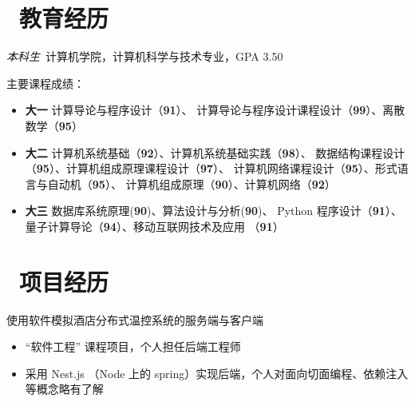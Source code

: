 \documentclass{resume}
\begin{document}



\section{\faGraduationCap\  教育经历}
\textit{本科生}\ 计算机学院，计算机科学与技术专业，GPA 3.50

\begin{onehalfspacing}
  主要课程成绩：
\end{onehalfspacing}
\begin{itemize}
  \item \textbf{大一} \quad 计算导论与程序设计（\textbf{91}）、
        计算导论与程序设计课程设计（\textbf{99}）、离散数学（\textbf{95}）
  \item \textbf{大二} \quad 计算机系统基础（\textbf{92}）、计算机系统基础实践（\textbf{98}）、
        数据结构课程设计（\textbf{95}）、计算机组成原理课程设计（\textbf{97}）、
        计算机网络课程设计（\textbf{95}）、形式语言与自动机（\textbf{95}）、
        计算机组成原理（\textbf{90}）、计算机网络（\textbf{92}）
  \item \textbf{大三} \quad 数据库系统原理(\textbf{90})、算法设计与分析(\textbf{90})、
        Python 程序设计（\textbf{91}）、量子计算导论（\textbf{94}）、移动互联网技术及应用	（\textbf{91}）
\end{itemize}

\section{\faCode\ 项目经历}

\begin{onehalfspacing}
  使用软件模拟酒店分布式温控系统的服务端与客户端
  \begin{itemize}
    \item “软件工程” 课程项目，个人担任后端工程师
    \item 采用 Nest.js （Node 上的 spring）实现后端，个人对面向切面编程、依赖注入等概念略有了解
  \end{itemize}
\end{onehalfspacing}
\end{document}
